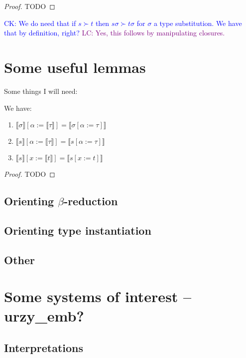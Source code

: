 \documentclass[runningheads,a4paper]{llncs}
\newcommand{\typeinterpret}[1]{\llbracket #1 \rrbracket}
\newcommand{\interpret}[1]{\llbracket #1 \rrbracket}
\newcommand{\CK}[1]{\textcolor{blue}{CK: #1}}
\newcommand{\LC}[1]{\textcolor{purple}{LC: #1}}
\begin{document}
\begin{proof}
  TODO
\end{proof}

\CK{We do need that if $s \succ t$ then $s\sigma \succ t\sigma$ for
  $\sigma$ a type substitution.  We have that by definition, right?}
\LC{Yes, this follows by manipulating closures.}

\section{Some useful lemmas}

Some things I will need:

\begin{lemma}\label{lem:substitutioninterpret}
We have:
\begin{enumerate}
\item\label{lem:substitutioninterpret:types}
  $\typeinterpret{\sigma}[\alpha:=\typeinterpret{\tau}] =
  \typeinterpret{\sigma[\alpha:=\tau]}$
\item\label{lem:substitutioninterpret:mixed}
  $\interpret{s}[\alpha:=\typeinterpret{\tau}] =
  \interpret{s[\alpha:=\tau]}$
\item\label{lem:substitutioninterpret:terms}
  $\interpret{s}[x:=\interpret{t}] = \interpret{s[x:=t]}$
\end{enumerate}
\end{lemma}

\begin{proof}
TODO
\end{proof}

\subsection{Orienting $\beta$-reduction}

\subsection{Orienting type instantiation}

\subsection{Other}

\section{Some systems of interest -- urzy\_emb?}

\subsection{Interpretations}
\end{document}
